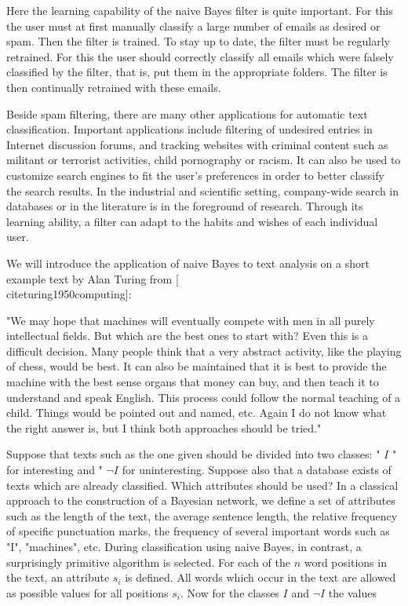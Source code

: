 \documentclass[10pt]{book}
\begin{document}
Here the learning capability of the naive Bayes filter is quite important. For this the user must at first manually classify a large number of emails as desired or spam. Then the filter is trained. To stay up to date, the filter must be regularly retrained. For this the user should correctly classify all emails which were falsely classified by the filter, that is, put them in the appropriate folders. The filter is then continually retrained with these emails.


Beside spam filtering, there are many other applications for automatic text classification. Important applications include filtering of undesired entries in Internet discussion forums, and tracking websites with criminal content such as militant or terrorist activities, child pornography or racism. It can also be used to customize search engines to fit the user's preferences in order to better classify the search results. In the industrial and scientific setting, company-wide search in databases or in the literature is in the foreground of research. Through its learning ability, a filter can adapt to the habits and wishes of each individual user.

We will introduce the application of naive Bayes to text analysis on a short example text by Alan Turing from [\\cite{turing1950computing}]:

\begin{displayquote}
"We may hope that machines will eventually compete with men in all purely intellectual fields. But which are the best ones to start with? Even this is a difficult decision. Many people think that a very abstract activity, like the playing of chess, would be best. It can also be maintained that it is best to provide the machine with the best sense organs that money can buy, and then teach it to understand and speak English. This process could follow the normal teaching of a child. Things would be pointed out and named, etc. Again I do not know what the right answer is, but I think both approaches should be tried."
\end{displayquote}

Suppose that texts such as the one given should be divided into two classes: " $I$ " for interesting and " $\neg I$ for uninteresting. Suppose also that a database exists of texts which are already classified. Which attributes should be used? In a classical approach to the construction of a Bayesian network, we define a set of attributes such as the length of the text, the average sentence length, the relative frequency of specific punctuation marks, the frequency of several important words such as "I", "machines", etc. During classification using naive Bayes, in contrast, a surprisingly primitive algorithm is selected. For each of the $n$ word positions in the text, an attribute $s_{i}$ is defined. All words which occur in the text are allowed as possible values for all positions $s_{i}$. Now for the classes $I$ and $\neg I$ the values
\end{document}
